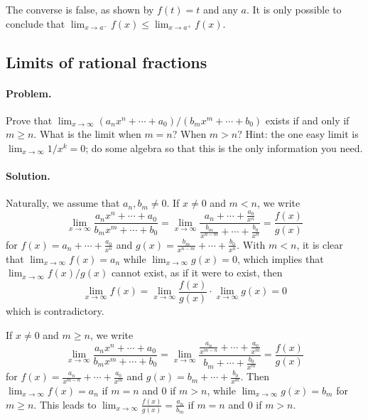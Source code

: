 \documentclass{article}
\begin{document}
The converse is false, as shown by $f(t) = t$ and any $a$. It is only possible
to conclude that $\lim_{x \rightarrow a^-}f(x) \leq \lim_{x \rightarrow a^+}
f(x)$.

\setcounter{subsection}{31}
\subsection{Limits of rational fractions}

\paragraph{Problem.} Prove that $\lim_{x \rightarrow \infty}(a_nx^n + \cdots +
a_0)/(b_mx^m + \cdots + b_0)$ exists if and only if $m \geq n$. What is the
limit when $m = n$? When $m > n$? Hint: the one easy limit is $\lim_{x
\rightarrow \infty}1/x^k = 0$; do some algebra so that this is the only
information you need.

\paragraph{Solution.} Naturally, we assume that $a_n, b_m \neq 0$. If $x \neq
0$ and $m < n$, we write \begin{equation*}
  \lim_{x \rightarrow \infty}\frac{a_nx^n + \cdots + a_0}{b_mx^m + \cdots + b_0
    } = \lim_{x \rightarrow \infty}\frac{a_n + \cdots + \frac{a_0}{x^n}}{\frac{
    b_m}{x^{n - m}} + \cdots + \frac{b_0}{x^n}} = \frac{f(x)}{g(x)}
\end{equation*} for $f(x) = a_n + \cdots + \frac{a_0}{x^n}$ and $g(x) = \frac{
b_m}{x^{n - m}} + \cdots + \frac{b_0}{x^n}$. With $m < n$, it is clear that
$\lim_{x \rightarrow \infty}f(x) = a_n$ while $\lim_{x \rightarrow \infty}g(x)
= 0$, which implies that $\lim_{x \rightarrow \infty}f(x)/g(x)$ cannot exist,
as if it were to exist, then \begin{equation*}
  \lim_{x \rightarrow \infty}f(x) = \lim_{x \rightarrow \infty}\frac{f(x)}{g(x)
  } \cdot \lim_{x \rightarrow \infty}g(x) = 0
\end{equation*} which is contradictory.

If $x \neq 0$ and $m \geq n$, we write \begin{equation*}
  \lim_{x \rightarrow \infty}\frac{a_nx^n + \cdots + a_0}{b_mx^m + \cdots + b_0
    } = \lim_{x \rightarrow \infty}\frac{\frac{a_n}{x^{m - n}} + \cdots +
    \frac{a_0}{x^m}}{b_m + \cdots + \frac{b_0}{x^m}} = \frac{f(x)}{g(x)}
\end{equation*} for $f(x) = \frac{a_n}{x^{m - n}} + \cdots + \frac{a_0}{x^m}$
and $g(x) = b_m + \cdots + \frac{b_0}{x^m}$. Then $\lim_{x \rightarrow \infty}
f(x) = a_n$ if $m = n$ and 0 if $m > n$, while $\lim_{x \rightarrow \infty}g(x)
= b_m$ for $m \geq n$. This leads to $\lim_{x \rightarrow \infty}\frac{f(x)}{
g(x)} = \frac{a_n}{b_m}$ if $m = n$ and 0 if $m > n$.
\end{document}
